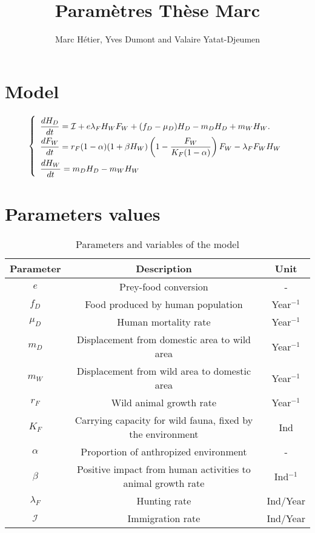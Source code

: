 \documentclass{article}
\title{Paramètres Thèse Marc}
\author{Marc Hétier, Yves Dumont  and Valaire Yatat-Djeumen}
\newcommand{\lfw}{\lambda_{F}}
\newcommand{\cI}{\mathcal{I}}
\begin{document}
\maketitle
\section{Model}

\begin{equation}
\def\arraystretch{2}
\left\{ 
\begin{array}{l}
\dfrac{dH_D}{dt}= \cI + e\lfw H_W F_W + (f_D - \mu_D) H_D - m_D H_D + m_W H_W. \\
\dfrac{dF_W}{dt} = r_F(1- \alpha) (1+ \beta H_W) \left(1 - \dfrac{F_W}{K_F(1-\alpha)} \right) F_W - \lfw F_W H_W \\
\dfrac{dH_W}{dt}= m_D H_D - m_W H_W 
\end{array} \right.
\label{equationsHDFWHW}
\end{equation}



\section{Parameters values}
\begin{table}[ht]
\begin{tabular}{|c|c|c|}
\hline 
Parameter & Description & Unit \\ 
\hline \hline
$e$ & Prey-food conversion & - \\
$f_D$ & Food produced by human population & Year$^{-1}$ \\
$\mu_D$ & Human mortality rate  & Year$^{-1}$ \\
$m_D$ & Displacement from domestic area to wild area & Year$^{-1}$ \\
$m_W$ & Displacement from wild area to domestic area & Year$^{-1}$ \\
$r_F$ & Wild animal growth rate & Year$^{-1}$ \\
$K_F$ & Carrying capacity for wild fauna, fixed by the environment& Ind \\
$\alpha$ & Proportion of anthropized environment & - \\
$\beta$ & Positive impact from human activities to animal growth rate & Ind$^{-1}$  \\
$\lfw$ & Hunting rate & Ind/Year\\
$\mathcal{I}$ & Immigration rate &Ind/Year\\
\hline
\end{tabular}
\caption{Parameters and variables of the model}
\end{table}
\end{document}

